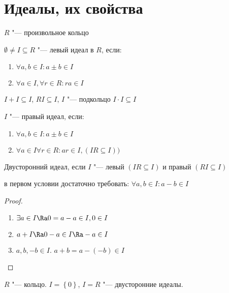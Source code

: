 ﻿\section{Идеалы, их свойства}
$R$ "--- произвольное кольцо

\begin{Def}
	$\emptyset \ne I \subseteq R$ "--- левый идеал в $R$, если:
	\begin{enumerate}
		\item $ \forall a, b \in I \colon a \pm b \in I $
		\item $ \forall a \in I, \forall r \in R \colon ra \in I $
	\end{enumerate}
\end{Def}

\begin{Rem}
$I + I \subseteq I$, $RI \subseteq I$, $I$ "--- подкольцо $I \cdot I \subseteq I$
\end{Rem}

\begin{Def}
	$I$ "--- правый идеал, если:
	\begin{enumerate}
		\item $ \forall a, b \in I \colon a \pm b \in I $
		\item $ \forall a \in I \forall r \in R \colon ar \in I, (IR \subseteq I)) $
	\end{enumerate}
\end{Def}

\begin{Def}
	Двусторонний идеал, если $I$ "--- левый $(IR \subseteq I)$ и правый $(RI \subseteq I)$
\end{Def}

\begin{Rem}
	в первом условии достаточно требовать: $\forall a, b \in I \colon a - b \in I$
\end{Rem}

\begin{proof}
	\begin{enumerate}
		\item $\exists a \in I \Ra 0 = a - a \in I, 0 \in I$
		\item $a + I \Ra 0 - a \in I \Ra -a \in I$
		\item $a, b, -b \in I$. $a + b = a - (-b) \in I$
	\end{enumerate}
\end{proof}

\begin{Rem}
	$R$ "--- кольцо. $I = \left\{ 0 \right\}$, $I = R$ "--- двусторонние идеалы.
\end{Rem}

